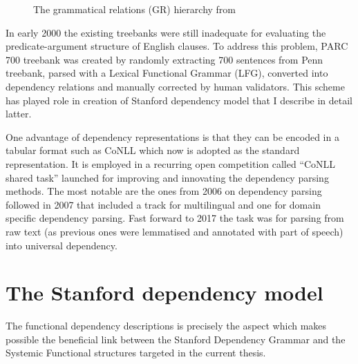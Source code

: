 \begin{figure}[!ht]
    \caption{The grammatical relations (GR) hierarchy from \citet{Carroll1999}}
    \label{fig:grEarly}
\end{figure}

In early 2000 the existing treebanks were still inadequate for evaluating the predicate-argument structure of English clauses. To address this problem, PARC 700 treebank \citep{King2003} was created by randomly extracting 700 sentences from Penn treebank, parsed with a Lexical Functional Grammar (LFG), converted into dependency relations and manually corrected by human validators. This scheme has played role in creation of Stanford dependency model that I describe in detail latter. 

One advantage of dependency representations is that they can be encoded in a tabular format such as CoNLL \citep{nivre2007conll} which now is adopted as the standard representation. It is employed in a recurring open competition called ``CoNLL shared task'' launched for improving and innovating the dependency parsing methods. The most notable are the ones from 2006 on dependency parsing \citep{Buchholz2006} followed in 2007 that included a track for multilingual and one for domain specific dependency parsing. Fast forward to 2017 \citep{zeman2017conll} the task was for parsing from raw text (as previous ones were lemmatised and annotated with part of speech) into universal dependency.

\section{The Stanford dependency model}
The functional dependency descriptions is precisely the aspect which makes possible the beneficial link between the Stanford Dependency Grammar and the Systemic Functional structures targeted in the current thesis. 

